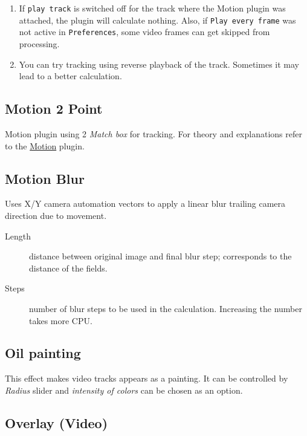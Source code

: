 \begin{enumerate}
    \item If \texttt{play track} is switched off for the track where the Motion plugin was attached, the plugin will calculate nothing. Also, if \texttt{Play every frame} was not active in \texttt{Preferences}, some video frames can get skipped from processing.
    \item You can try tracking using reverse playback of the track. Sometimes it may lead to a better calculation.
\end{enumerate}

\subsection{Motion 2 Point}%
\label{sub:motion_2_point}

Motion plugin using 2 \textit{Match box} for tracking. For theory and explanations refer to the \hyperref[sub:motion]{Motion} plugin.

\subsection{Motion Blur}%
\label{sub:motion_blur}

Uses X/Y camera automation vectors to apply a linear blur trailing camera direction due to movement.
\begin{description}
    \item[Length] distance between original image and final blur step; corresponds to the distance of the fields.
    \item[Steps] number of blur steps to be used in the calculation. Increasing the number takes more CPU.
\end{description}

\subsection{Oil painting}%
\label{sub:oil_painting}

This effect makes video tracks appears as a painting. It can be controlled by \textit{Radius} slider and \textit{intensity of colors} can be chosen as an option.

\subsection{Overlay (Video)}%
\label{sub:overlay}

